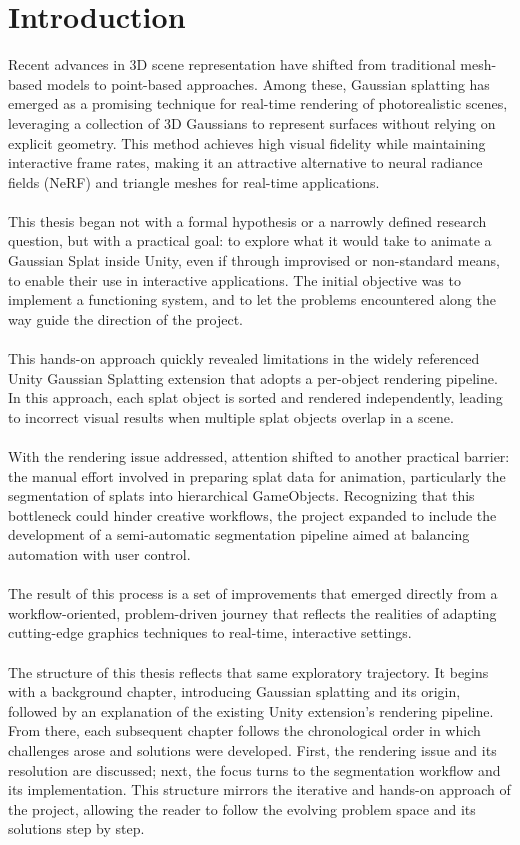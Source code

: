 \documentclass[12pt]{article}
\begin{document}
\section{Introduction}
Recent advances in 3D scene representation have shifted from traditional mesh-based models to point-based approaches. Among these, Gaussian splatting \parencite{OriginalSplatting} has emerged as a promising technique for real-time rendering of photorealistic scenes, leveraging a collection of 3D Gaussians to represent surfaces without relying on explicit geometry. This method achieves high visual fidelity while maintaining interactive frame rates, making it an attractive alternative to neural radiance fields (NeRF) and triangle meshes for real-time applications.
\\\\
This thesis began not with a formal hypothesis or a narrowly defined research question, but with a practical goal: to explore what it would take to animate a Gaussian Splat inside Unity, even if through improvised or non-standard means, to enable their use in interactive applications. The initial objective was to implement a functioning system, and to let the problems encountered along the way guide the direction of the project.
\\\\
This hands-on approach quickly revealed limitations in the widely referenced Unity Gaussian Splatting extension \parencite{Aras} that adopts a per-object rendering pipeline. In this approach, each splat object is sorted and rendered independently, leading to incorrect visual results when multiple splat objects overlap in a scene.
\\\\
With the rendering issue addressed, attention shifted to another practical barrier: the manual effort involved in preparing splat data for animation, particularly the segmentation of splats into hierarchical GameObjects. Recognizing that this bottleneck could hinder creative workflows, the project expanded to include the development of a semi-automatic segmentation pipeline aimed at balancing automation with user control.
\\\\
The result of this process is a set of improvements that emerged directly from a workflow-oriented, problem-driven journey that reflects the realities of adapting cutting-edge graphics techniques to real-time, interactive settings.
\\\\
The structure of this thesis reflects that same exploratory trajectory. It begins with a background chapter, introducing Gaussian splatting and its origin, followed by an explanation of the existing Unity extension’s rendering pipeline. From there, each subsequent chapter follows the chronological order in which challenges arose and solutions were developed. First, the rendering issue and its resolution are discussed; next, the focus turns to the segmentation workflow and its implementation. This structure mirrors the iterative and hands-on approach of the project, allowing the reader to follow the evolving problem space and its solutions step by step.
\end{document}
